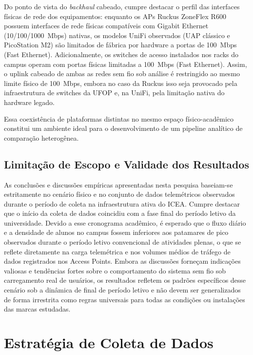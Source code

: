 Do ponto de vista do \textit{backhaul} cabeado, cumpre destacar o perfil das interfaces físicas de rede dos equipamentos: enquanto os APs Ruckus ZoneFlex R600 possuem interfaces de rede físicas compatíveis com Gigabit Ethernet (10/100/1000~Mbps) nativas, os modelos UniFi observados (UAP clássico e PicoStation M2) são limitados de fábrica por hardware a portas de 100~Mbps (Fast Ethernet). Adicionalmente, os switches de acesso instalados nos racks do campus operam com portas físicas limitadas a 100~Mbps (Fast Ethernet). Assim, o uplink cabeado de ambas as redes sem fio sob análise é restringido ao mesmo limite físico de 100~Mbps, embora no caso da Ruckus isso seja provocado pela infraestrutura de switches da UFOP e, na UniFi, pela limitação nativa do hardware legado.

Essa coexistência de plataformas distintas no mesmo espaço físico-acadêmico constitui um ambiente ideal para o desenvolvimento de um pipeline analítico de comparação heterogênea.

\subsection{Limitação de Escopo e Validade dos Resultados}
\label{subsec:metodologia_escopo}

As conclusões e discussões empíricas apresentadas nesta pesquisa baseiam-se estritamente no cenário físico e no conjunto de dados telemétricos observados durante o período de coleta na infraestrutura ativa do ICEA. Cumpre destacar que o início da coleta de dados coincidiu com a fase final do período letivo da universidade. Devido a esse cronograma acadêmico, é esperado que o fluxo diário e a densidade de alunos no campus fossem inferiores aos patamares de pico observados durante o período letivo convencional de atividades plenas, o que se reflete diretamente na carga telemétrica e nos volumes médios de tráfego de dados registrados nos Access Points. Embora as discussões forneçam indicações valiosas e tendências fortes sobre o comportamento do sistema sem fio sob carregamento real de usuários, os resultados refletem os padrões específicos desse cenário sob a dinâmica de final de período letivo e não devem ser generalizados de forma irrestrita como regras universais para todas as condições ou instalações das marcas estudadas.


\section{Estratégia de Coleta de Dados}
\label{sec:metodologia_coleta}

